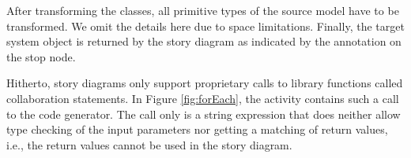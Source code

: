 After transforming the classes, all primitive types of the source model have to be transformed. We omit the details here due to space limitations. 
Finally, the target system object  is returned by the story diagram as indicated by the annotation  on the stop node.

Hitherto, story diagrams only support proprietary calls to library functions called collaboration statements. In Figure \ref{fig:forEach}, the activity  contains such a call to the code generator. The call only is a string expression that does neither allow type checking of the input parameters nor getting a matching of return values, i.e., the return values cannot be used in the story diagram.